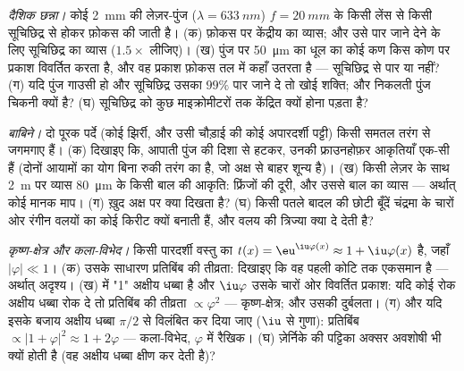 \begin{exercise}[$\star\star$]\label{exo:b2:diffraction:9}
\emph{दैशिक छन्ना।} कोई \qty{2}{mm} की लेज़र-पुंज ($\lambda = \qty{633}{nm}$)
$f = \qty{20}{mm}$ के किसी लेंस से किसी सूचिछिद्र से होकर फ़ोकस की जाती है। (क) फ़ोकस पर
केंद्रीय  का व्यास; और उसे पार जाने देने के लिए सूचिछिद्र का व्यास
($1.5\times$ लीजिए)। (ख) पुंज पर \qty{50}{\micro m} का धूल का कोई कण
किस कोण पर प्रकाश विवर्तित करता है, और वह प्रकाश फ़ोकस तल में कहाँ उतरता है
--- सूचिछिद्र से पार या नहीं? (ग) यदि पुंज गाउसी हो और सूचिछिद्र उसका $99\%$
पार जाने दे तो खोई शक्ति; और निकलती पुंज चिकनी क्यों है? (घ) सूचिछिद्र को कुछ
माइक्रोमीटरों तक केंद्रित क्यों होना पड़ता है?
\end{exercise}

\begin{exercise}[$\star\star\star$]\label{exo:b2:diffraction:10}
\emph{बाबिने।} दो पूरक पर्दे (कोई झिर्री, और उसी चौड़ाई की कोई
अपारदर्शी पट्टी) किसी समतल तरंग से जगमगाए हैं। (क) दिखाइए कि, आपाती पुंज
की दिशा से हटकर, उनकी फ्राउनहोफ़र आकृतियाँ
एक-सी हैं (दोनों आयामों का योग बिना रुकी
तरंग का है, जो अक्ष से बाहर शून्य है)। (ख) किसी लेज़र के साथ \qty{2}{m} पर व्यास
\qty{80}{\micro m} के किसी बाल की आकृति: फ्रिंजों की दूरी, और उससे
बाल का व्यास --- अर्थात् कोई मानक माप। (ग) ख़ुद अक्ष पर क्या
दिखता है? (घ) किसी पतले बादल की छोटी बूँदें चंद्रमा के चारों ओर रंगीन वलयों का कोई
किरीट क्यों बनाती हैं, और वलय की त्रिज्या क्या दे देती है?
\end{exercise}

\begin{exercise}[$\star\star\star$]\label{exo:b2:diffraction:11}
\emph{कृष्ण-क्षेत्र और कला-विभेद।} किसी पारदर्शी वस्तु का
$t(x) = \eu^{\iu\varphi(x)} \approx 1 + \iu\varphi(x)$ है, जहाँ $|\varphi| \ll 1$। (क) उसके साधारण
प्रतिबिंब की तीव्रता: दिखाइए कि वह पहली कोटि तक एकसमान है --- अर्थात् अदृश्य। (ख)
 में "1" अक्षीय धब्बा है और $\iu\varphi$ उसके चारों ओर
विवर्तित प्रकाश: यदि कोई रोक अक्षीय धब्बा रोक दे तो प्रतिबिंब की
तीव्रता $\propto\varphi^2$ --- कृष्ण-क्षेत्र; और उसकी दुर्बलता। (ग) और यदि इसके बजाय
अक्षीय धब्बा $\pi/2$ से विलंबित कर दिया जाए ($\iu$ से गुणा): प्रतिबिंब $\propto|1 +
\varphi|^2 \approx 1 + 2\varphi$ --- कला-विभेद, $\varphi$ में रैखिक। (घ)
ज़ेर्निके की पट्टिका अक्सर अवशोषी भी क्यों होती है (वह अक्षीय धब्बा क्षीण कर देती है)?
\end{exercise}

